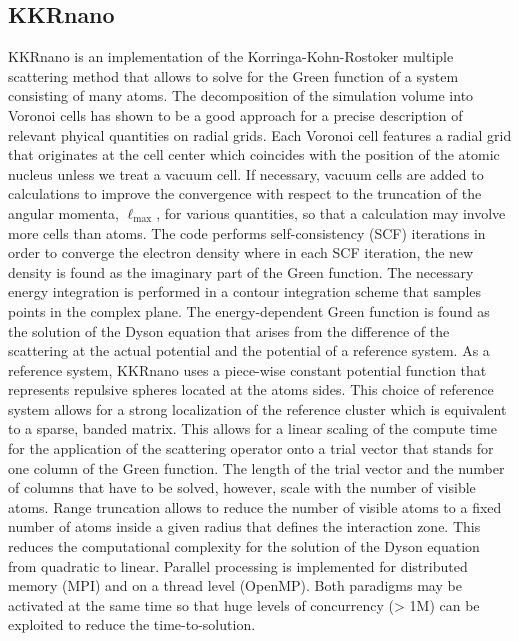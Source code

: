 \documentclass{llncs}
\newcommand{\ellmax}{\ell_{\mathrm{max}}}
\def\KKRnano{{KKRnano}}
\begin{document}
\subsection{KKRnano} \label{section:kkrnano}
\KKRnano{} is an implementation of the Korringa-Kohn-Rostoker multiple scattering method \cite{korringa, kohn-rostoker}
that allows to solve for the Green function of a system consisting of many atoms.
The decomposition of the simulation volume into Voronoi cells has shown to be a good
approach for a precise description of relevant phyical quantities on radial grids.
Each Voronoi cell features a radial grid that originates at the cell center
which coincides with the position of the atomic nucleus unless we treat a vacuum cell.
If necessary, vacuum cells are added to calculations to improve the convergence with respect to the truncation of
the angular momenta, $\ellmax$, for various quantities, so that a calculation may involve more cells than atoms.
The code performs self-consistency (SCF) iterations in order to converge the electron density
where in each SCF iteration, the new density is found as the imaginary part of the Green function.
The necessary energy integration is performed in a contour integration scheme that
samples points in the complex plane.
The energy-dependent Green function is found as the solution of the Dyson equation
that arises from the difference of the scattering at the actual potential and the potential 
of a reference system. As a reference system, \KKRnano{} uses a piece-wise constant potential
function that represents repulsive spheres located at the atoms sides.
This choice of reference system allows for a strong localization of the reference cluster
which is equivalent to a sparse, banded matrix. 
This allows for a linear scaling of the compute time for the application of the scattering operator
onto a trial vector that stands for one column of the Green function. 
The length of the trial vector and the number of columns that have to be solved, however, scale with
the number of visible atoms.
Range truncation allows to reduce the number of visible atoms to a fixed number 
of atoms inside a given radius that defines the interaction zone. This reduces the computational
complexity for the solution of the Dyson equation from quadratic to linear.
Parallel processing is implemented for distributed memory (MPI) and on a thread level (OpenMP).
Both paradigms may be activated at the same time so that huge levels of concurrency 
(> 1M) can be exploited to reduce the time-to-solution.
\end{document}
